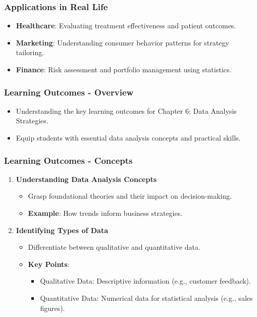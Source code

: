 \documentclass[aspectratio=169]{beamer}
\begin{document}
\begin{frame}[fragile]
    \frametitle{Applications in Real Life}
    \begin{itemize}
        \item \textbf{Healthcare}: Evaluating treatment effectiveness and patient outcomes.
        \item \textbf{Marketing}: Understanding consumer behavior patterns for strategy tailoring.
        \item \textbf{Finance}: Risk assessment and portfolio management using statistics.
    \end{itemize}
\end{frame}

\begin{frame}[fragile]
    \frametitle{Learning Outcomes - Overview}
    \begin{itemize}
        \item Understanding the key learning outcomes for Chapter 6: Data Analysis Strategies.
        \item Equip students with essential data analysis concepts and practical skills.
    \end{itemize}
\end{frame}

\begin{frame}[fragile]
    \frametitle{Learning Outcomes - Concepts}
    \begin{enumerate}
        \item \textbf{Understanding Data Analysis Concepts}
            \begin{itemize}
                \item Grasp foundational theories and their impact on decision-making.
                \item \textbf{Example}: How trends inform business strategies.
            \end{itemize}
        
        \item \textbf{Identifying Types of Data}
            \begin{itemize}
                \item Differentiate between qualitative and quantitative data.
                \item \textbf{Key Points}:
                    \begin{itemize}
                        \item Qualitative Data: Descriptive information (e.g., customer feedback).
                        \item Quantitative Data: Numerical data for statistical analysis (e.g., sales figures).
                    \end{itemize}
            \end{itemize}
    \end{enumerate}
\end{frame}
\end{document}
